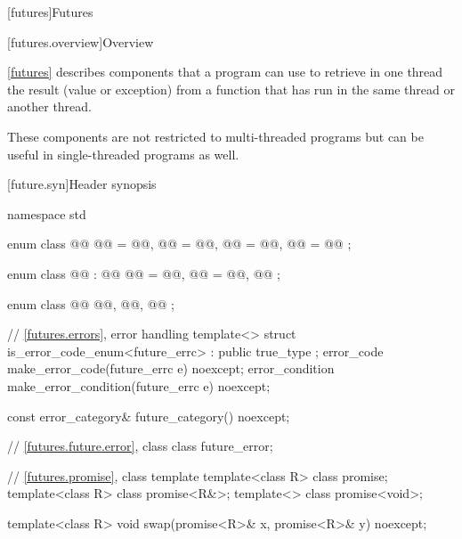 [futures]{Futures}

[futures.overview]{Overview}

\pnum
\ref{futures} describes components that a \Cpp{} program can use to retrieve in one thread the
result (value or exception) from a function that has run in the same thread or another thread.
\begin{note}
These components are not restricted to multi-threaded programs but can be useful in
single-threaded programs as well.
\end{note}

[future.syn]{Header  synopsis}

%
\begin{codeblock}
namespace std {
  enum class @@ {
    @@ = @@,
    @@ = @@,
    @@ = @@,
    @@ = @@
  };

  enum class @@ : @\unspec{}@ {
    @@ = @\unspec{}@,
    @@ = @\unspec{}@,
    @@
  };

  enum class @@ {
    @@,
    @@,
    @@
  };

  // \ref{futures.errors}, error handling
  template<> struct is_error_code_enum<future_errc> : public true_type { };
  error_code make_error_code(future_errc e) noexcept;
  error_condition make_error_condition(future_errc e) noexcept;

  const error_category& future_category() noexcept;

  // \ref{futures.future.error}, class 
  class future_error;

  // \ref{futures.promise}, class template 
  template<class R> class promise;
  template<class R> class promise<R&>;
  template<> class promise<void>;

  template<class R>
    void swap(promise<R>& x, promise<R>& y) noexcept;

}
\end{codeblock}
